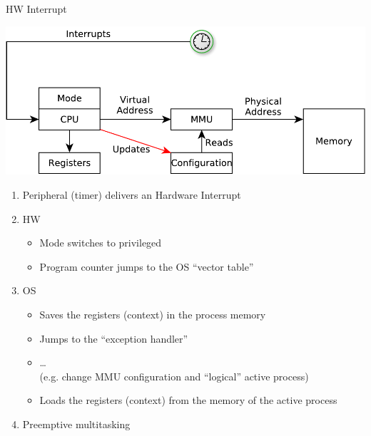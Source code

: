 \documentclass{beamer}
\begin{document}
\begin{frame}{HW Interrupt}
  \begin{center}
  \includegraphics[width=0.5\linewidth]{timer}
  \end{center}
  \begin{enumerate}
  \item<1-> Peripheral (timer) delivers an Hardware Interrupt
  \item<2-> HW
  \begin{itemize}
    \item Mode switches to privileged
    \item Program counter jumps to the OS ``vector table''
  \end{itemize}
  \item<3-> OS
  \begin{itemize}
    \item Saves the registers (context) in the process memory
    \item Jumps to the ``exception handler''
    \item \dots \\
 (e.g. change MMU configuration and ``logical'' active process)
    \item Loads the registers (context) from the memory of the  \alert{active}
      process
  \end{itemize}
  \item<4-> Preemptive multitasking
\end{enumerate}
\end{frame}
\end{document}
